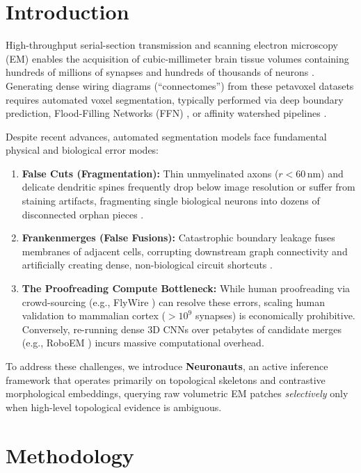 \documentclass[10pt,twocolumn,letterpaper]{article}
\begin{document}
\section{Introduction}

High-throughput serial-section transmission and scanning electron microscopy (EM) enables the acquisition of cubic-millimeter brain tissue volumes containing hundreds of millions of synapses and hundreds of thousands of neurons \cite{microns2025,dorkenwald2024}. Generating dense wiring diagrams (``connectomes'') from these petavoxel datasets requires automated voxel segmentation, typically performed via deep boundary prediction, Flood-Filling Networks (FFN) \cite{januszewski2018}, or affinity watershed pipelines \cite{macrina2021}.

Despite recent advances, automated segmentation models face fundamental physical and biological error modes:
\begin{enumerate}
    \item \textbf{False Cuts (Fragmentation):} Thin unmyelinated axons ($r < 60\,\text{nm}$) and delicate dendritic spines frequently drop below image resolution or suffer from staining artifacts, fragmenting single biological neurons into dozens of disconnected orphan pieces \cite{schneider2016}.
    \item \textbf{Frankenmerges (False Fusions):} Catastrophic boundary leakage fuses membranes of adjacent cells, corrupting downstream graph connectivity and artificially creating dense, non-biological circuit shortcuts \cite{macrina2021}.
    \item \textbf{The Proofreading Compute Bottleneck:} While human proofreading via crowd-sourcing (e.g., FlyWire \cite{dorkenwald2024}) can resolve these errors, scaling human validation to mammalian cortex ($>10^9$ synapses) is economically prohibitive. Conversely, re-running dense 3D CNNs over petabytes of candidate merges (e.g., RoboEM \cite{boergens2023}) incurs massive computational overhead.
\end{enumerate}

To address these challenges, we introduce \textbf{Neuronauts}, an active inference framework that operates primarily on topological skeletons and contrastive morphological embeddings, querying raw volumetric EM patches \textit{selectively} only when high-level topological evidence is ambiguous.

\section{Methodology}
\end{document}
